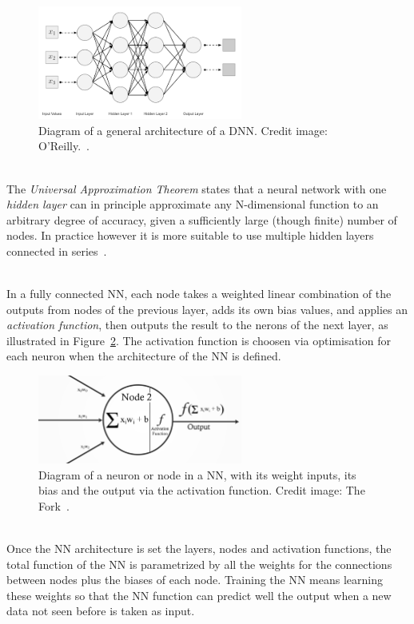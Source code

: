 \begin{figure}[h]
  \centering
  \includegraphics[width=0.6\textwidth]{./plots/DNNArchitecture.png}
  \caption{Diagram of a general architecture of a DNN. Credit image: O'Reilly.~\cite{OReilly}.}
  \label{fig:DNN}
\end{figure}

\ \\The \emph{Universal Approximation Theorem} states that a neural network with one \emph{hidden layer} can in principle approximate any N-dimensional function to an arbitrary degree of accuracy, given a sufficiently large (though finite) number of nodes. In practice however it is more suitable to use multiple hidden layers connected in series~\cite{AndrewNg}.

\ \\In a fully connected NN, each node takes a weighted linear combination of the outputs from nodes of the previous layer, adds its own bias values, and applies an \emph{activation function}, then outputs the result to the nerons of the next layer, as illustrated in Figure~\ref{fig:Neuron}. The activation function is choosen via optimisation for each neuron when the architecture of the NN is defined. 

\begin{figure}[h]
  \centering
  \includegraphics[width=0.6\textwidth]{./plots/Neuron.png}
  \caption{Diagram of a neuron or node in a NN, with its weight inputs, its bias and the output via the activation function. Credit image: The Fork~\cite{TheFork}.}
  \label{fig:Neuron}
\end{figure}

\ \\Once the NN architecture is set the layers, nodes and activation functions, the total function of the NN is parametrized by all the weights for the connections between nodes plus the biases of each node. Training the NN means learning these weights so that the NN function can predict well the output when a new data not seen before is taken as input.

